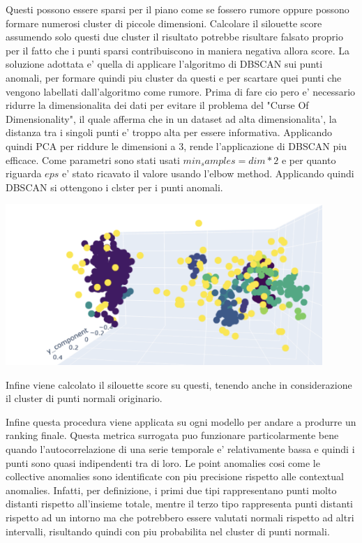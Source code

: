 Questi possono essere sparsi per il piano come se fossero rumore oppure possono formare numerosi cluster di piccole dimensioni. Calcolare il silouette score assumendo solo questi due cluster il risultato potrebbe risultare falsato proprio per il fatto che i punti sparsi contribuiscono in maniera negativa allora score.
La soluzione adottata e' quella di applicare l'algoritmo di DBSCAN sui punti anomali, per formare quindi piu cluster da questi e per scartare quei punti che vengono labellati dall'algoritmo come rumore.
Prima di fare cio pero e' necessario ridurre la dimensionalita dei dati per evitare il problema del "Curse Of Dimensionality", il quale afferma che in un dataset ad alta dimensionalita', la distanza tra i singoli punti e' troppo alta per essere informativa.
Applicando quindi PCA per riddure le dimensioni a 3, rende l'applicazione di DBSCAN piu efficace. Come parametri sono stati usati $min_samples=dim * 2$ e per quanto riguarda $eps$ e' stato ricavato il valore usando l'elbow method.
Applicando quindi DBSCAN si ottengono i clster per i punti anomali.
\begin{center}
	\includegraphics[width=12cm, scale=1]{images/plot-dbscan-anomalies}
    \captionsetup{type=figure}
\end{center}

Infine viene calcolato il silouette score su questi, tenendo anche in considerazione il cluster di punti normali originario.

Infine questa procedura viene applicata su ogni modello per andare a produrre un ranking finale.
Questa metrica surrogata puo funzionare particolarmente bene quando l'autocorrelazione di una serie temporale e' relativamente bassa e quindi i punti sono quasi indipendenti tra di loro. Le point anomalies cosi come le collective anomalies sono identificate con piu precisione rispetto alle contextual anomalies. Infatti, per definizione, i primi due tipi rappresentano punti molto distanti rispetto all'insieme totale, mentre il terzo tipo rappresenta punti distanti rispetto ad un intorno ma che potrebbero essere valutati normali rispetto ad altri intervalli, risultando quindi con piu probabilita nel cluster di punti normali.
